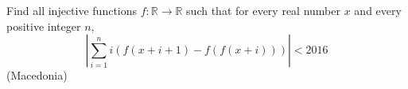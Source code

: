 Find all injective functions $f: \mathbb R \rightarrow \mathbb R$ such that for every real number $x$ and every positive integer $n$, $$ \left|\sum_{i=1}^n i\left(f(x+i+1)-f(f(x+i))\right)\right|<2016$$(Macedonia)